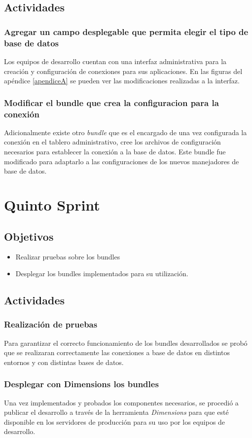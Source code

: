 \subsection{Actividades}
\subsubsection{Agregar un campo desplegable que permita elegir el tipo de base de datos}
Los equipos de desarrollo cuentan con una interfaz administrativa para la creación y configuración
de conexiones para sus aplicaciones. En las figuras del apéndice \ref{apendiceA} se pueden ver las
modificaciones realizadas a la interfaz.
\subsubsection{Modificar el bundle que crea la configuracion para la conexión}
Adicionalmente existe otro \emph{bundle} que es el encargado de una vez configurada la conexión
en el tablero administrativo, cree los archivos de configuración necesarios para establecer
la conexión a la base de datos. Este bundle fue modificado para adaptarlo a las configuraciones
de los nuevos manejadores de base de datos.

\section{Quinto Sprint}

\subsection{Objetivos}
\begin{itemize}
  \item Realizar pruebas sobre los bundles
  \item Desplegar los bundles implementados para su utilización.
\end{itemize}
\subsection{Actividades}
\subsubsection{Realización de pruebas}
Para garantizar el correcto funcionamiento de los bundles desarrollados
se probó que se realizaran correctamente las conexiones a base de datos en distintos
entornos y con distintas bases de datos.
\subsubsection{Desplegar con Dimensions los bundles}
Una vez implementados y probados los componentes necesarios, se procedió a publicar
el desarrollo a través de la herramienta \emph{Dimensions} para que esté disponible
en los servidores de producción para su uso por los equipos de desarrollo.
